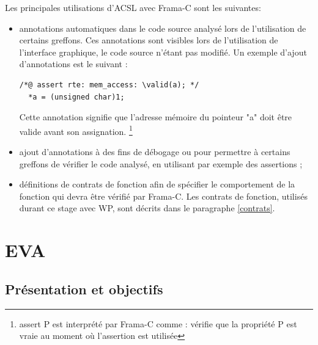 Les principales utilisations d'ACSL avec Frama-C sont les suivantes:
\begin{itemize}
	\item annotations automatiques dans le code source analysé lors de l'utilisation de certains greffons. Ces annotations sont visibles lors de l'utilisation de l'interface graphique, le code source n'étant pas modifié. Un exemple d'ajout d'annotations est le suivant :

\begin{lstlisting}
/*@ assert rte: mem_access: \valid(a); */
  *a = (unsigned char)1;
\end{lstlisting}

Cette annotation signifie que l'adresse mémoire du pointeur "a" doit être valide avant son assignation. \footnote{assert P est interprété par Frama-C comme : vérifie que la propriété P est vraie au moment où l'assertion est utilisée}

\item ajout d'annotations à des fins de débogage ou pour permettre à certains greffons de vérifier le code analysé, en utilisant par exemple des assertions ;
\item définitions de contrats de fonction afin de spécifier le comportement de la fonction qui devra être vérifié par Frama-C. Les contrats de fonction, utilisés durant ce stage avec WP, sont décrits dans le paragraphe \ref{contrats}.

\end{itemize}

\section{EVA}\label{EVA}

\subsection{Présentation et objectifs}

